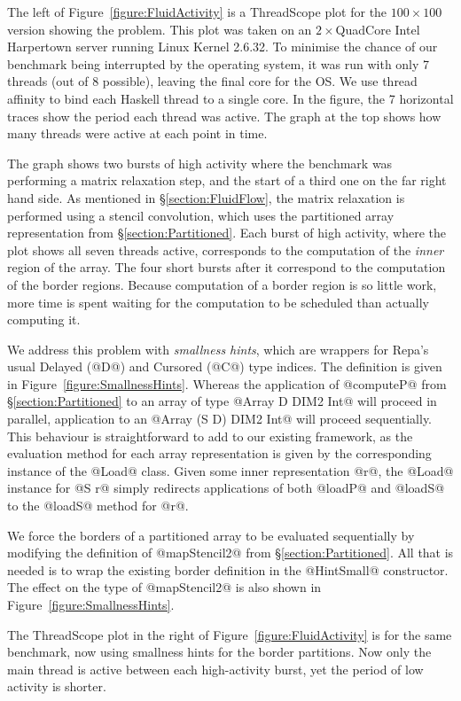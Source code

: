 The left of Figure~\ref{figure:FluidActivity} is a ThreadScope plot for the $100 \times 100$ version showing the problem. This plot was taken on an $2\times$QuadCore Intel Harpertown server running Linux Kernel 2.6.32. To minimise the chance of our benchmark being interrupted by the operating system, it was run with only 7 threads (out of 8 possible), leaving the final core for the OS. We use thread affinity to bind each Haskell thread to a single core. In the figure, the 7 horizontal traces show the period each thread was active. The graph at the top shows how many threads were active at each point in time. 

The graph shows two bursts of high activity where the benchmark was performing a matrix relaxation step, and the start of a third one on the far right hand side. As mentioned in \S\ref{section:FluidFlow}, the matrix relaxation is performed using a stencil convolution, which uses the partitioned array representation from \S\ref{section:Partitioned}. Each burst of high activity, where the plot shows all seven threads active, corresponds to the computation of the \emph{inner} region of the array. The four short bursts after it correspond to the computation of the border regions. Because computation of a border region is so little work, more time is spent waiting for the computation to be scheduled than actually computing it.

We address this problem with \emph{smallness hints}, which are wrappers for Repa's usual Delayed (@D@) and Cursored (@C@) type indices. The definition is given in Figure~\ref{figure:SmallnessHints}. Whereas the application of @computeP@ from \S\ref{section:Partitioned} to an array of type @Array D DIM2 Int@ will proceed in parallel, application to an @Array (S D) DIM2 Int@ will proceed sequentially. This behaviour is straightforward to add to our existing framework, as the evaluation method for each array representation is given by the corresponding instance of the @Load@ class. Given some inner representation @r@, the @Load@ instance for @S r@ simply redirects applications of both @loadP@ and @loadS@ to the @loadS@ method for @r@. 

We force the borders of a partitioned array to be evaluated sequentially by modifying the definition of @mapStencil2@ from \S\ref{section:Partitioned}. All that is needed is to wrap the existing border definition in the @HintSmall@ constructor. The effect on the type of @mapStencil2@ is also shown in Figure~\ref{figure:SmallnessHints}.

The ThreadScope plot in the right of Figure~\ref{figure:FluidActivity} is for the same benchmark, now using smallness hints for the border partitions. Now only the main thread is active between each high-activity burst, yet the period of low activity is shorter. 

